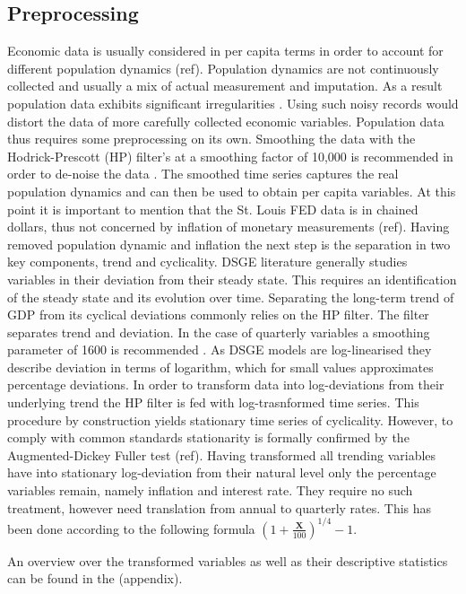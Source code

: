 \documentclass[12pt,a4paper,english]{article} %
\newcommand{\matr}[1]{\mathbf{#1}} %
\begin{document}
	\subsection{Preprocessing}
	Economic data is usually considered in per capita terms in order to account for different population dynamics (ref). Population dynamics are not continuously collected and usually a mix of actual measurement and imputation. As a result population data exhibits significant irregularities \cite{pfeifer_guide_2021}. Using such noisy records would distort the data of more carefully collected economic variables. Population data thus requires some preprocessing on its own. Smoothing the data with the Hodrick-Prescott (HP) filter's at a smoothing factor of 10,000 is recommended in order to de-noise the data \cite{edge_judging_2013}. The smoothed time series captures the real population dynamics and can then be used to obtain per capita variables. At this point it is important to mention that the St. Louis FED data is in chained dollars, thus not concerned by inflation of monetary measurements (ref). 	
	Having removed population dynamic and inflation the next step is the separation in two key components, trend and cyclicality. DSGE literature generally studies variables in their deviation from their steady state. This requires an identification of the steady state and its evolution over time. Separating the long-term trend of GDP from its cyclical deviations commonly relies on the HP filter. The filter separates trend and deviation. In the case of quarterly variables a smoothing parameter of 1600 is recommended \cite{ravn_adjusting_2002}. As DSGE models are log-linearised they describe deviation in terms of logarithm, which for small values approximates percentage deviations. In order to transform data into log-deviations from their underlying trend the HP filter is fed with log-trasnformed time series. This procedure by construction yields stationary time series of cyclicality. However, to comply with common standards stationarity is formally confirmed by the Augmented-Dickey Fuller test (ref). Having transformed all trending variables have into stationary log-deviation from their natural level only the percentage variables remain, namely inflation and interest rate. They require no such treatment, however need translation from annual to quarterly rates. This has been done according to the following formula $(1 + \frac{\matr{X}}{100})^{1/4} - 1$.
	
	An overview over the transformed variables as well as their descriptive statistics can be found in the (appendix).
	
\end{document}
